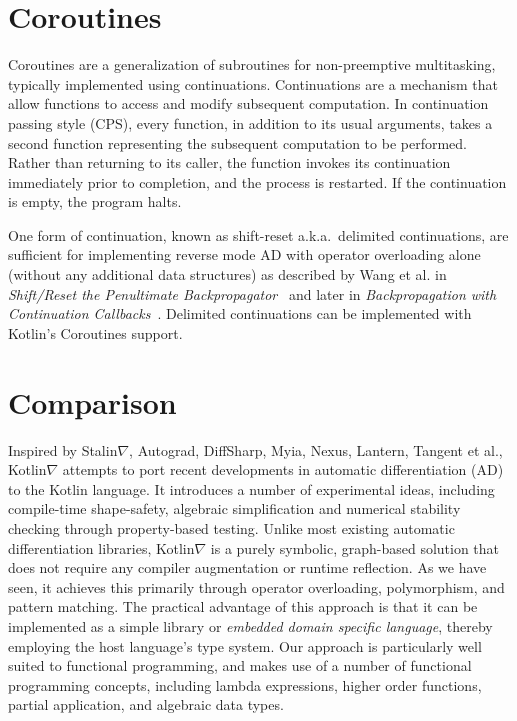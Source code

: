 \documentclass[12pt,initial,twoside,maitrise]{dms}
\numberwithin{equation}{section}
\numberwithin{table}{chapter}
\numberwithin{figure}{chapter}
\begin{document}
\section{Coroutines}\label{sec:coroutines}

Coroutines are a generalization of subroutines for non-preemptive multitasking, typically implemented using continuations. Continuations are a mechanism that allow functions to access and modify subsequent computation. In continuation passing style (CPS), every function, in addition to its usual arguments, takes a second function representing the subsequent computation to be performed. Rather than returning to its caller, the function invokes its continuation immediately prior to completion, and the process is restarted. If the continuation is empty, the program halts.

One form of continuation, known as shift-reset a.k.a.\ delimited continuations, are sufficient for implementing reverse mode AD with operator overloading alone (without any additional data structures) as described by Wang et al. in \textit{Shift/Reset the Penultimate Backpropagator}~\citep{wang2018demystifying} and later in \textit{Backpropagation with Continuation Callbacks}~\citep{wang2018backpropagation}. Delimited continuations can be implemented with Kotlin's Coroutines support.

\section{Comparison}\label{sec:comparison}

Inspired by Stalin$\nabla$, Autograd, DiffSharp, Myia, Nexus, Lantern, Tangent et al., Kotlin$\nabla$ attempts to port recent developments in automatic differentiation (AD) to the Kotlin language. It introduces a number of experimental ideas, including compile-time shape-safety, algebraic simplification and numerical stability checking through property-based testing. Unlike most existing automatic differentiation libraries, Kotlin$\nabla$ is a purely symbolic, graph-based solution that does not require any compiler augmentation or runtime reflection. As we have seen, it achieves this primarily through operator overloading, polymorphism, and pattern matching. The practical advantage of this approach is that it can be implemented as a simple library or \textit{embedded domain specific language}, thereby employing the host language's type system. Our approach is particularly well suited to functional programming, and makes use of a number of functional programming concepts, including lambda expressions, higher order functions, partial application, and algebraic data types. \\
\end{document}
